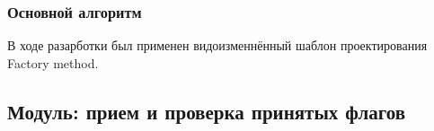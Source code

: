 \subsubsection{Основной алгоритм}
В ходе разарботки был применен видоизменнённый шаблон проектирования Factory method.


\subsection{Модуль: прием и проверка принятых флагов} %


\clearpage
